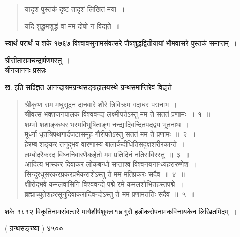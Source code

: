 \documentclass[11pt, openany]{book}
\begin{document}
\begin{quote}
    \qt 
\hspace{15mm} यादृशं पुस्तकं दृष्टं तादृशं लिखितं मया~।\\
\vspace{-7mm}

\hspace{15mm} यदि शुद्धमशुद्धं वा मम दोषो न विद्यते~॥
\end{quote}

स्वार्थं परार्थं च शके १७६७ विश्वावसुनामसंवत्सरे पौषशुद्धद्वितीयायां
भौमवासरे पुस्तकं समाप्तम्~।
\vspace{-2mm}

\begin{center}
{\qt श्रीसीतारामचन्द्रार्पणमस्तु~।\\
 श्रीगजाननः प्रसन्नः~।}
\end{center}

ख. इति सञ्ज्ञित आनन्दाश्रमग्रन्थसङ्ग्रहालयस्थे ग्रन्थसमाप्तिरेवं
विद्यते\textendash
\begin{quote}
    \qt 
 श्रीकृष्ण राम मधुसूदन दानवारे शौरे त्रिविक्रम गदाधर पद्मनाभ~।\\
 श्रीवत्स भक्तजनपालक विश्ववन्द्य लक्ष्मीपतेऽस्तु मम ते सततं प्रणामः~॥~१~॥\\
 शम्भो शशाङ्कधर भस्मविभूषिताङ्ग नन्द्यादिवन्दितपदद्वय भूतनाथ~।\\
 मूर्ध्ना धृतत्रिपथगार्द्रजटासमूह गौरीपतेऽस्तु सततं मम ते प्रणामः~॥~२~॥~\\
 हेरम्ब शङ्कर तनूद्भव वारणास्य बालार्कदीधितिसदृक्षशरीरकान्ते~।\\
 लम्बोदरैकरद विघ्ननिवारणैकहेतो मम प्रतिदिनं नतिराविरस्तु~॥~३~॥\\
 आदित्य भास्कर दिवाकर लोकबन्धो सप्ताश्व विश्वनयनान्ध्यहरारुणेश~।\\
 सिन्दूरधूसरकरप्रकरप्रभैकराशेऽस्तु ते मम मतिप्रकरः सदैव~॥~४~॥\\
 क्षीरोद्भवे कमलवासिनि विश्ववन्द्ये पद्मे रमे कमलशोभितहस्तपद्मे~।\\
 ब्रह्माच्युतेशहरसूनुदिवाकरादिवन्द्येऽस्तु ते मम प्रणामततिः सदैव~॥~५~॥~
\end{quote}

 शके १८१२ विकृतिनामसंवत्सरे मार्गशीर्षशुक्ल\textendash \,१४\textendash \,गुरौ हर्डीकरोपनामकविनायकेन लिखितमिदम्~।
\begin{center}
    ( ग्रन्थसङ्ख्या ) ४५००
\end{center}

\thispagestyle{empty}
\afterpage{\fancyhead[R]{\thepage}}
\afterpage{\fancyhead[L]{}}
\cfoot{}
 
\end{document}

